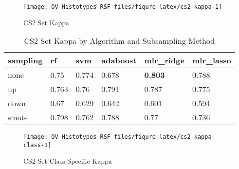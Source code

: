 \documentclass[
]{report}
\begin{document}
\begin{figure}[H]

{\centering \texttt{[image: OV\_Histotypes\_RSF\_files/figure-latex/cs2-kappa-1]} 

}

\caption{CS2 Set Kappa}\label{fig:cs2-kappa}
\end{figure}

\begin{table}

\caption{\label{tab:cs2-kappa-table}CS2 Set Kappa by Algorithm and Subsampling Method}
\centering
\begin{tabular}[t]{l|l|l|l|l|l}
\hline
sampling & rf & svm & adaboost & mlr\_ridge & mlr\_lasso\\
\hline
none & 0.75 & 0.774 & 0.678 & \textbf{0.803} & 0.788\\
\hline
up & 0.763 & 0.76 & 0.791 & 0.787 & 0.775\\
\hline
down & 0.67 & 0.629 & 0.642 & 0.601 & 0.594\\
\hline
smote & 0.798 & 0.762 & 0.788 & 0.77 & 0.736\\
\hline
\end{tabular}
\end{table}

\begin{figure}[H]

{\centering \texttt{[image: OV\_Histotypes\_RSF\_files/figure-latex/cs2-kappa-class-1]} 

}

\caption{CS2 Set Class-Specific Kappa}\label{fig:cs2-kappa-class}
\end{figure}
\end{document}
